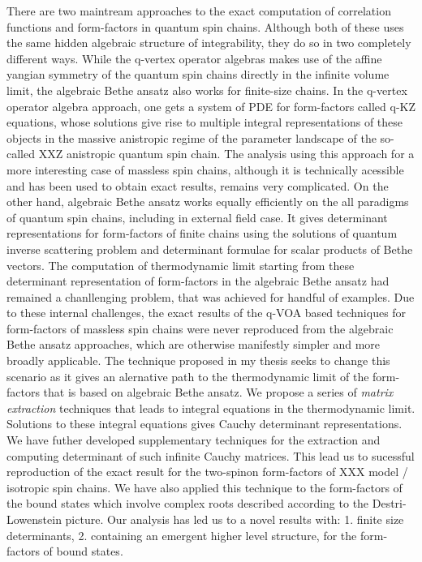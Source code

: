 \documentclass[a4paper, 12pt, DIV=13]{scrarticle}
\begin{document}
There are two maintream approaches to the exact computation of correlation functions and form-factors in quantum spin chains. Although both of these uses the same hidden algebraic structure of integrability, they do so in two completely different ways.
While the q-vertex operator algebras makes use of the affine yangian symmetry of the quantum spin chains directly in the infinite volume limit, the algebraic Bethe ansatz also works for finite-size chains.
In the q-vertex operator algebra approach, one gets a system of PDE for form-factors called q-KZ equations, whose solutions give rise to multiple integral representations of these objects in the massive anistropic regime of the parameter landscape of the so-called XXZ anistropic quantum spin chain. The analysis using this approach for a more interesting case of massless spin chains, although it is technically acessible and has been used to obtain exact results, remains very complicated.
On the other hand, algebraic Bethe ansatz works equally efficiently on the all paradigms of quantum spin chains, including in external field case. It gives determinant representations for form-factors of finite chains using the solutions of quantum inverse scattering problem and determinant formulae for scalar products of Bethe vectors.
The computation of thermodynamic limit starting from these determinant representation of form-factors in the algebraic Bethe ansatz had remained a chanllenging problem, that was achieved for handful of examples.
Due to these internal challenges, the exact results of the q-VOA based techniques for form-factors of massless spin chains were never reproduced from the algebraic Bethe ansatz approaches, which are otherwise manifestly simpler and more broadly applicable.
The technique proposed in my thesis seeks to change this scenario as it gives an alernative path to the thermodynamic limit of the form-factors that is based on algebraic Bethe ansatz.
We propose a series of \textit{matrix extraction} techniques that leads to integral equations in the thermodynamic limit. Solutions to these integral equations gives Cauchy determinant representations. We have futher developed supplementary techniques for the extraction and computing determinant of such infinite Cauchy matrices.
This lead us to sucessful reproduction of the exact result for the two-spinon form-factors of XXX model / isotropic spin chains.
We have also applied this technique to the form-factors of the bound states which involve complex roots described according to the Destri-Lowenstein picture.
Our analysis has led us to a novel results with: 1. finite size determinants, 2. containing an emergent higher level structure, for the form-factors of bound states.
\end{document}
